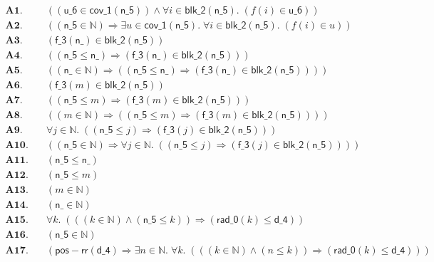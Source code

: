 \documentclass[11pt]{article}
\begin{document}
\begin{align*}
  \mathbf{A1.}\quad & ((\mathsf{u\_6} \in \mathsf{cov\_1}(\mathsf{n\_5})) \wedge \forall i \in \mathsf{blk\_2}(\mathsf{n\_5}).\; (f(i) \in \mathsf{u\_6})) \\
  \mathbf{A2.}\quad & ((\mathsf{n\_5} \in \mathbb{N}) \Rightarrow \exists u \in \mathsf{cov\_1}(\mathsf{n\_5}).\; \forall i \in \mathsf{blk\_2}(\mathsf{n\_5}).\; (f(i) \in u)) \\
  \mathbf{A3.}\quad & (\mathsf{f\_3}(\mathsf{n\_}) \in \mathsf{blk\_2}(\mathsf{n\_5})) \\
  \mathbf{A4.}\quad & ((\mathsf{n\_5} \leq \mathsf{n\_}) \Rightarrow (\mathsf{f\_3}(\mathsf{n\_}) \in \mathsf{blk\_2}(\mathsf{n\_5}))) \\
  \mathbf{A5.}\quad & ((\mathsf{n\_} \in \mathbb{N}) \Rightarrow ((\mathsf{n\_5} \leq \mathsf{n\_}) \Rightarrow (\mathsf{f\_3}(\mathsf{n\_}) \in \mathsf{blk\_2}(\mathsf{n\_5})))) \\
  \mathbf{A6.}\quad & (\mathsf{f\_3}(m) \in \mathsf{blk\_2}(\mathsf{n\_5})) \\
  \mathbf{A7.}\quad & ((\mathsf{n\_5} \leq m) \Rightarrow (\mathsf{f\_3}(m) \in \mathsf{blk\_2}(\mathsf{n\_5}))) \\
  \mathbf{A8.}\quad & ((m \in \mathbb{N}) \Rightarrow ((\mathsf{n\_5} \leq m) \Rightarrow (\mathsf{f\_3}(m) \in \mathsf{blk\_2}(\mathsf{n\_5})))) \\
  \mathbf{A9.}\quad & \forall j \in \mathbb{N}.\; ((\mathsf{n\_5} \leq j) \Rightarrow (\mathsf{f\_3}(j) \in \mathsf{blk\_2}(\mathsf{n\_5}))) \\
  \mathbf{A10.}\quad & ((\mathsf{n\_5} \in \mathbb{N}) \Rightarrow \forall j \in \mathbb{N}.\; ((\mathsf{n\_5} \leq j) \Rightarrow (\mathsf{f\_3}(j) \in \mathsf{blk\_2}(\mathsf{n\_5})))) \\
  \mathbf{A11.}\quad & (\mathsf{n\_5} \leq \mathsf{n\_}) \\
  \mathbf{A12.}\quad & (\mathsf{n\_5} \leq m) \\
  \mathbf{A13.}\quad & (m \in \mathbb{N}) \\
  \mathbf{A14.}\quad & (\mathsf{n\_} \in \mathbb{N}) \\
  \mathbf{A15.}\quad & \forall k.\; (((k \in \mathbb{N}) \wedge (\mathsf{n\_5} \leq k)) \Rightarrow (\mathsf{rad\_0}(k) \leq \mathsf{d\_4})) \\
  \mathbf{A16.}\quad & (\mathsf{n\_5} \in \mathbb{N}) \\
  \mathbf{A17.}\quad & (\mathsf{pos{-}rr}(\mathsf{d\_4}) \Rightarrow \exists n \in \mathbb{N}.\; \forall k.\; (((k \in \mathbb{N}) \wedge (n \leq k)) \Rightarrow (\mathsf{rad\_0}(k) \leq \mathsf{d\_4}))) \\

\end{align*}
\end{document}
